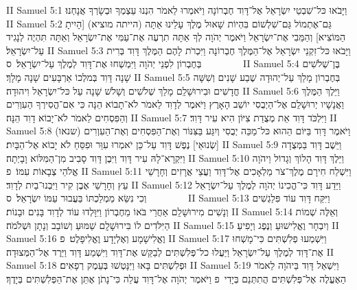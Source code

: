 II Samuel 5:1	וַיָּבֹאוּ כּל־שִׁבְטֵי יִשְׂרָאֵל אֶל־דָּוִד חֶבְרוֹנָה וַיֹּאמְרוּ לֵאמֹר הִנְנוּ עַצְמְךָ וּבְשָׂרְךָ אֲנָחְנוּ׃
II Samuel 5:2	גַּם־אֶתְמוֹל גַּם־שִׁלְשׁוֹם בִּהְיוֹת שָׁאוּל מֶלֶךְ עָלֵינוּ אַתָּה (הייתה מוציא) [הָיִיתָ הַמּוֹצִיא] וְהַמֵּבִי אֶת־יִשְׂרָאֵל וַיֹּאמֶר יְהֹוָה לְךָ אַתָּה תִרְעֶה אֶת־עַמִּי אֶת־יִשְׂרָאֵל וְאַתָּה תִּהְיֶה לְנָגִיד עַל־יִשְׂרָאֵל׃
II Samuel 5:3	וַיָּבֹאוּ כּל־זִקְנֵי יִשְׂרָאֵל אֶל־הַמֶּלֶךְ חֶבְרוֹנָה וַיִּכְרֹת לָהֶם הַמֶּלֶךְ דָּוִד בְּרִית בְּחֶבְרוֹן לִפְנֵי יְהֹוָה וַיִּמְשְׁחוּ אֶת־דָּוִד לְמֶלֶךְ עַל־יִשְׂרָאֵל׃ {ס}        
II Samuel 5:4	בֶּן־שְׁלֹשִׁים שָׁנָה דָּוִד בְּמלְכוֹ אַרְבָּעִים שָׁנָה מָלָךְ׃
II Samuel 5:5	בְּחֶבְרוֹן מָלַךְ עַל־יְהוּדָה שֶׁבַע שָׁנִים וְשִׁשָּׁה חֳדָשִׁים וּבִירוּשָׁלַ͏ִם מָלַךְ שְׁלֹשִׁים וְשָׁלֹשׁ שָׁנָה עַל כּל־יִשְׂרָאֵל וִיהוּדָה׃
II Samuel 5:6	וַיֵּלֶךְ הַמֶּלֶךְ וַאֲנָשָׁיו יְרוּשָׁלַ͏ִם אֶל־הַיְבֻסִי יוֹשֵׁב הָאָרֶץ וַיֹּאמֶר לְדָוִד לֵאמֹר לֹא־תָבוֹא הֵנָּה כִּי אִם־הֱסִירְךָ הַעִוְרִים וְהַפִּסְחִים לֵאמֹר לֹא־יָבוֹא דָוִד הֵנָּה׃
II Samuel 5:7	וַיִּלְכֹּד דָּוִד אֵת מְצֻדַת צִיּוֹן הִיא עִיר דָּוִד׃
II Samuel 5:8	וַיֹּאמֶר דָּוִד בַּיּוֹם הַהוּא כּל־מַכֵּה יְבֻסִי וְיִגַּע בַּצִּנּוֹר וְאֶת־הַפִּסְחִים וְאֶת־הַעִוְרִים (שנאו) [שְׂנוּאֵי] נֶפֶשׁ דָּוִד עַל־כֵּן יֹאמְרוּ עִוֵּר וּפִסֵּחַ לֹא יָבוֹא אֶל־הַבָּיִת׃
II Samuel 5:9	וַיֵּשֶׁב דָּוִד בַּמְּצֻדָה וַיִּקְרָא־לָהּ עִיר דָּוִד וַיִּבֶן דָּוִד סָבִיב מִן־הַמִּלּוֹא וָבָיְתָה׃
II Samuel 5:10	וַיֵּלֶךְ דָּוִד הָלוֹךְ וְגָדוֹל וַיהֹוָה אֱלֹהֵי צְבָאוֹת עִמּוֹ׃ {פ}
II Samuel 5:11	וַיִּשְׁלַח חִירָם מֶלֶךְ־צֹר מַלְאָכִים אֶל־דָּוִד וַעֲצֵי אֲרָזִים וְחָרָשֵׁי עֵץ וְחָרָשֵׁי אֶבֶן קִיר וַיִּבְנוּ־בַיִת לְדָוִד׃
II Samuel 5:12	וַיֵּדַע דָּוִד כִּי־הֱכִינוֹ יְהֹוָה לְמֶלֶךְ עַל־יִשְׂרָאֵל וְכִי נִשֵּׂא מַמְלַכְתּוֹ בַּעֲבוּר עַמּוֹ יִשְׂרָאֵל׃ {ס}        
II Samuel 5:13	וַיִּקַּח דָּוִד עוֹד פִּלַגְשִׁים וְנָשִׁים מִירוּשָׁלַ͏ִם אַחֲרֵי בֹּאוֹ מֵחֶבְרוֹן וַיִּוָּלְדוּ עוֹד לְדָוִד בָּנִים וּבָנוֹת׃
II Samuel 5:14	וְאֵלֶּה שְׁמוֹת הַיִּלֹּדִים לוֹ בִּירוּשָׁלָ͏ִם שַׁמּוּעַ וְשׁוֹבָב וְנָתָן וּשְׁלֹמֹה׃
II Samuel 5:15	וְיִבְחָר וֶאֱלִישׁוּעַ וְנֶפֶג וְיָפִיעַ׃
II Samuel 5:16	וֶאֱלִישָׁמָע וְאֶלְיָדָע וֶאֱלִיפָלֶט׃ {פ}
II Samuel 5:17	וַיִּשְׁמְעוּ פְלִשְׁתִּים כִּי־מָשְׁחוּ אֶת־דָּוִד לְמֶלֶךְ עַל־יִשְׂרָאֵל וַיַּעֲלוּ כל־פְּלִשְׁתִּים לְבַקֵּשׁ אֶת־דָּוִד וַיִּשְׁמַע דָּוִד וַיֵּרֶד אֶל־הַמְּצוּדָה׃
II Samuel 5:18	וּפְלִשְׁתִּים בָּאוּ וַיִּנָּטְשׁוּ בְּעֵמֶק רְפָאִים׃
II Samuel 5:19	וַיִּשְׁאַל דָּוִד בַּיהֹוָה לֵאמֹר הַאֶעֱלֶה אֶל־פְּלִשְׁתִּים הֲתִתְּנֵם בְּיָדִי {פ} וַיֹּאמֶר יְהֹוָה אֶל־דָּוִד עֲלֵה כִּי־נָתֹן אֶתֵּן אֶת־הַפְּלִשְׁתִּים בְּיָדֶךָ׃
